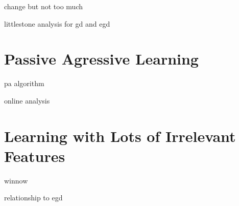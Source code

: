 change but not too much

littlestone analysis for gd and egd

\section{Passive Agressive Learning}

pa algorithm

online analysis

\section{Learning with Lots of Irrelevant Features}

winnow

relationship to egd


\begin{exercises}
\begin{Ex}
\TODO

\begin{solution}
\TODO
\end{solution}
\end{Ex}

\end{exercises}
